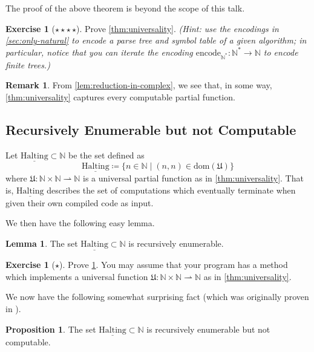 \documentclass[11pt,a4paper,reqno]{amsart}
\theoremstyle{plain}
\theoremstyle{definition}
\newtheorem{lemma}[theorem]{Lemma}
\newtheorem{proposition}[theorem]{Proposition}
\theoremstyle{definition}
\newtheorem{exercise}[theorem]{Exercise}
\newtheorem{remark}[theorem]{Remark}
\newcommand\exerciseLevelEasy{$\star$}
\newcommand\exerciseLevelVeryHard{$\star${\,}$\star${\,}$\star${\,}$\star$}
\begin{document}
The proof of the above theorem is beyond the scope of this talk.

\begin{exercise}[\exerciseLevelVeryHard]
	Prove \cref{thm:universality}. \textit{(Hint: use the encodings in \cref{sec:only-natural} to encode a parse tree and symbol table of a given algorithm; in particular, notice that you can iterate the encoding $\mathrm{encode}_{\mathbb N^*}\colon \mathbb N^*\to\mathbb N$ to encode finite trees.)}
\end{exercise}

\smallskip

\begin{remark}
	From \cref{lem:reduction-in-complex}, we see that, in some way, \cref{thm:universality} captures every computable partial function.
\end{remark}

\subsection{Recursively Enumerable but not Computable}\label{sec:re-not-comp}

Let $\underline{\mathrm{Halting}}\subset \mathbb N$ be the set defined as
\[
	\underline{\mathrm{Halting}}
	\coloneqq
	\{
	n\in \mathbb N \mid (n,n)\in \mathrm{dom}(\mathfrak U)
	\}
\]
where $\mathfrak U\colon \mathbb N \times \mathbb N\rightharpoonup \mathbb N$ is a universal partial function as in \cref{thm:universality}.
That is, $\underline{\mathrm{Halting}}$ describes the set of computations which eventually terminate when given their own compiled code as input.

We then have the following easy lemma.

\begin{lemma}\label{lem:Halt-is-re}
	The set $\underline{\mathrm{Halting}}\subset \mathbb N$ is recursively enumerable.
\end{lemma}

\begin{exercise}[\exerciseLevelEasy]
	Prove \cref{lem:Halt-is-re}.
	You may assume that your program has a method which implements a universal function $\mathfrak U\colon \mathbb N\times \mathbb N \rightharpoonup \mathbb N$ as in \cref{thm:universality}.
\end{exercise}

We now have the following somewhat surprising fact (which was originally proven in \cite{turing1936}).

\begin{proposition}\label{prop:re-but-not-comp}
	The set $\underline{\mathrm{Halting}}\subset \mathbb N$ is recursively enumerable but not computable.
\end{proposition}
\end{document}
